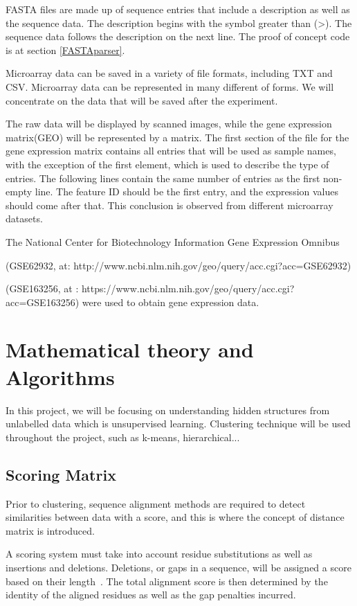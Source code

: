\documentclass[]{final_report}
\begin{document}
FASTA files are made up of sequence entries that include a description as well as the sequence data. The description begins with the symbol greater than (>). The sequence data follows the description on the next line. The proof of concept code is at section \ref{FASTAparser}.

Microarray data can be saved in a variety of file formats, including TXT and CSV. Microarray data can be represented in many different of forms. We will concentrate on the data that will be saved after the experiment.

The raw data will be displayed by scanned images, while the gene expression matrix(GEO) will be represented by a matrix. The first section of the file for the gene expression matrix contains all entries that will be used as sample names, with the exception of the first element, which is used to describe the type of entries. The following lines contain the same number of entries as the first non-empty line. The feature ID should be the first entry, and the expression values should come after that. This conclusion is observed from different microarray datasets. 

The National Center for Biotechnology Information Gene Expression Omnibus 

(GSE62932, at: http://www.ncbi.nlm.nih.gov/geo/query/acc.cgi?acc=GSE62932)

(GSE163256, at : https://www.ncbi.nlm.nih.gov/geo/query/acc.cgi?acc=GSE163256) were used to obtain gene expression data.

\section{Mathematical theory and Algorithms}
In this project, we will be focusing on understanding hidden structures from unlabelled data which is unsupervised learning. 
Clustering technique will be used throughout the project, such as k-means, hierarchical...

\subsection{Scoring Matrix}
Prior to clustering, sequence alignment methods are required to detect similarities between data with a score, and this is where the concept of distance matrix is introduced. 

A scoring system must take into account residue substitutions as well as insertions and deletions. Deletions, or gaps in a sequence, will be assigned a score based on their length~\cite{lesk2019introduction}. The total alignment score is then determined by the identity of the aligned residues as well as the gap penalties incurred.
\end{document}
